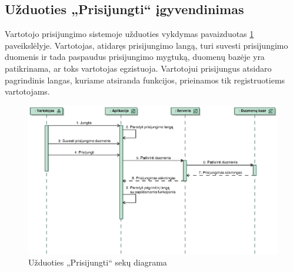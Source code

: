 \documentclass[12pt]{article}
\begin{document}
	\subsection{Užduoties „Prisijungti“ įgyvendinimas}
	Vartotojo prisijungimo sistemoje užduoties vykdymas pavaizduotas \ref{LogInSeq} paveikslėlyje. Vartotojas, atidaręs prisijungimo langą, turi suvesti prisijungimo duomenis ir tada paspaudus prisijungimo mygtuką, duomenų bazėje yra patikrinama, ar toks vartotojas egzistuoja. Vartotojui prisijungus atsidaro pagrindinis langas, kuriame atsiranda funkcijos, prieinamos tik registruotiems vartotojams.
	\begin{figure}[h]
		\begin{center}
			\includegraphics[width=\textwidth]{Prisijungti.eps}
			\caption{Užduoties „Prisijungti“ sekų diagrama\label{LogInSeq}}
		\end{center}
	\end{figure}
	

	\pagebreak
	
\end{document}
